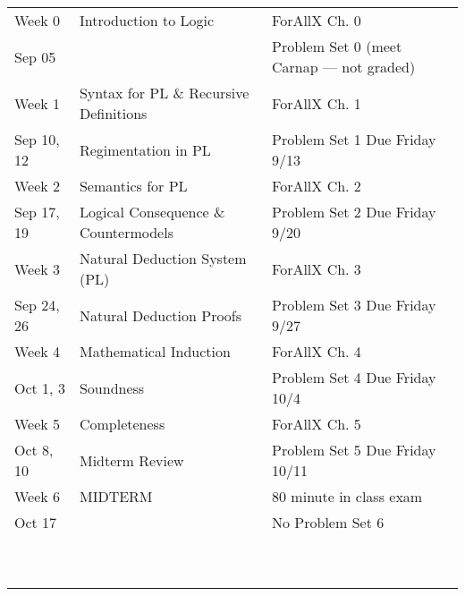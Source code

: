 \documentclass[letterpaper]{inzane_syllabus} %
\begin{document}
\begin{center}
\begin{tabularx}{\textwidth}{p{2.5cm}p{8cm}p{9cm}} %
\arrayrulecolor{myCOLOR}\hline
\multicolumn{3}{l}{\textbf{\textcolor{myCOLOR}{\large Part 1: Propositional Logic (PL)}}} \\
\hline

Week 0 & Introduction to Logic & ForAllX Ch. 0 \\
Sep 05 & & Problem Set 0 (meet Carnap --- not graded)\\
\arrayrulecolor{maingray}\hline

Week 1 & Syntax for PL \& Recursive Definitions & ForAllX Ch. 1\\
Sep 10, 12 & Regimentation in PL & Problem Set 1 Due Friday 9/13  \\
\arrayrulecolor{maingray}\hline

Week 2 & Semantics for PL & ForAllX Ch. 2 \\
  Sep 17, 19 & Logical Consequence \& Countermodels & Problem Set 2 Due Friday 9/20 \\
\arrayrulecolor{maingray}\hline

Week 3 & Natural Deduction System (PL) & ForAllX Ch. 3 \\
Sep 24, 26 & Natural Deduction Proofs & Problem Set 3 Due Friday 9/27 \\
\arrayrulecolor{maingray}\hline

Week 4 & Mathematical Induction & ForAllX Ch. 4 \\
Oct 1, 3 & Soundness & Problem Set 4 Due Friday 10/4\\
\arrayrulecolor{maingray}\hline

Week 5 & Completeness & ForAllX Ch. 5 \\
Oct 8, 10 & Midterm Review & Problem Set 5 Due Friday 10/11 \\
\arrayrulecolor{maingray}\hline

Week 6 & MIDTERM & 80 minute in class exam \\
Oct 17 & &  No Problem Set 6 \\
\arrayrulecolor{maingray}\hline
~\\
~\\



\end{tabularx}
\end{center}
\end{document}
